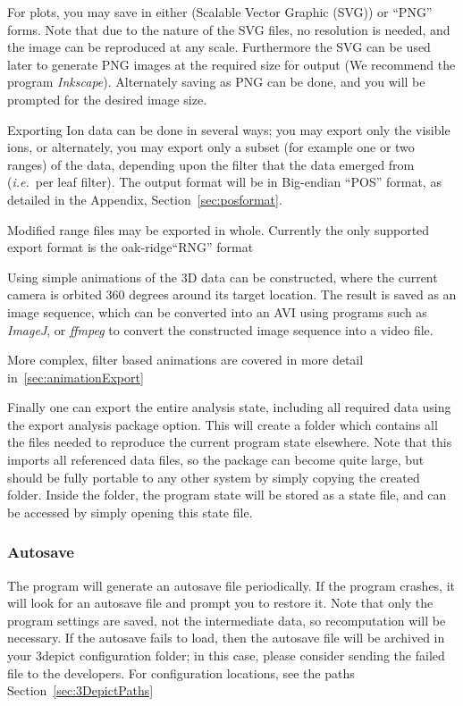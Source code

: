 \documentclass[10pt]{article}
\begin{document}
For plots, you may save in either (Scalable Vector Graphic (SVG)) or ``PNG'' forms. Note that due to the nature of the SVG files, no resolution is needed, and the image can be reproduced at any scale. Furthermore the SVG can be used later to generate PNG images at the required size for output (We recommend the program \textit{Inkscape}). Alternately saving as PNG can be done, and you will be prompted for the desired image size.

Exporting Ion data can be done in several ways; you may export only the visible ions, or alternately, you may export only a subset (for example one or two ranges) of the data, depending upon the filter that the data emerged from (\emph{i.e.}\ per leaf filter). The output format will be in Big-endian ``POS'' format, as  detailed in the Appendix, Section~\ref{sec:posformat}.

Modified range files may be exported in whole. Currently the only supported export format is the oak-ridge``RNG'' format

Using simple animations of the 3D data can be constructed, where the current camera is orbited 360 degrees around its target location. The result is saved as an image sequence, which can be converted into an AVI using programs such as \emph{ImageJ}, or \emph{ffmpeg} to convert the constructed image sequence into a video file.

More complex, filter based animations are covered in more detail in~\ref{sec:animationExport}

Finally one can export the entire analysis state, including all required data using the export analysis package option. This will create  a folder which contains all the files needed to reproduce the current program state elsewhere. Note that this imports all referenced data files, so the package can become quite large, but should be fully portable to any other system by simply copying the created folder. Inside the folder, the program state will be stored as a state file, and can be accessed by simply opening this state file.

\subsubsection{Autosave}
The program will generate an autosave file periodically. If the program crashes, it will look for an autosave file and prompt you to restore it. Note that only the program settings are saved, not the intermediate data, so recomputation will be necessary. If the autosave fails to load, then the autosave file will be archived in your 3depict configuration folder; in this case, please consider sending the failed file to the developers. For configuration locations, see the paths Section~\ref{sec:3DepictPaths}
\end{document}
